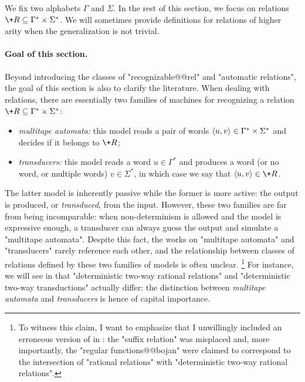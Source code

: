 We fix two alphabets $\Gamma$ and $\Sigma$. In the rest of this section, we focus
on relations $\+R \subseteq \Gamma^* \times \Sigma^*$. We will sometimes provide definitions
for relations of higher arity when the generalization is not trivial.

\paragraph*{Goal of this section.}
Beyond introducing the classes of "recognizable@@rel" and "automatic relations", the goal of
this section is also to clarify the literature. When dealing with relations, there are essentially 
two families of machines for recognizing a relation $\+R \subseteq \Gamma^* \times \Sigma^*$:
\begin{itemize}
	\item \emph{multitape automata:} this model reads a pair of words $\langle u,v\rangle \in \Gamma^* \times \Sigma^*$ and decides if it belongs to $\+R$;
	\item \emph{transducers:} this model reads a word $u \in \Gamma^*$ and produces a word (or no word, or multiple words) $v\in \Sigma^*$, in which case we say that $\tup{u,v} \in \+R$.  
\end{itemize}
The latter model is inherently passive while the former is more active: the output is produced,
or \emph{transduced}, from the input. However, these two families are far from being incomparable:
when non-determinism is allowed and the model is expressive enough, a transducer can always guess the output and simulate a "multitape automata". Despite this fact, the works on "multitape automata" and "transducers" rarely reference each other, and the relationship between classes
of relations defined by these two families of models is often unclear.%
\footnote{To witness this claim, I want to emphasize that I unwillingly included an erroneous 
version of  in \cite{Morvan2025Algebras}:
the "suffix relation" was misplaced and, more
importantly, the "regular functions@@bojan" were claimed to correspond to
the intersection of "rational relations" with "deterministic two-way rational relations".}
For instance, we will see in 
that "deterministic two-way rational relations"
and "deterministic two-way transductions" actually differ: the distinction
between \emph{multitape automata} and \emph{transducers} is hence of capital importance.

